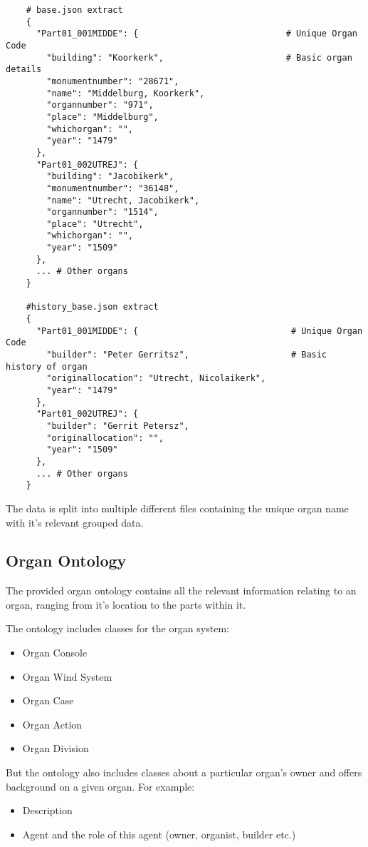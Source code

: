 \begin{lstlisting}
    # base.json extract
    {
      "Part01_001MIDDE": {                             # Unique Organ Code
        "building": "Koorkerk",                        # Basic organ details
        "monumentnumber": "28671",
        "name": "Middelburg, Koorkerk",
        "organnumber": "971",
        "place": "Middelburg",
        "whichorgan": "",
        "year": "1479"
      },
      "Part01_002UTREJ": {
        "building": "Jacobikerk",
        "monumentnumber": "36148",
        "name": "Utrecht, Jacobikerk",
        "organnumber": "1514",
        "place": "Utrecht",
        "whichorgan": "",
        "year": "1509"
      },
      ... # Other organs
    }

    #history_base.json extract
    {
      "Part01_001MIDDE": {                              # Unique Organ Code
        "builder": "Peter Gerritsz",                    # Basic history of organ
        "originallocation": "Utrecht, Nicolaikerk",
        "year": "1479"
      },
      "Part01_002UTREJ": {
        "builder": "Gerrit Petersz",
        "originallocation": "",
        "year": "1509"
      },
      ... # Other organs
    }
\end{lstlisting}

The data is split into multiple different files containing the unique organ name with it's relevant grouped data.  

\subsection{Organ Ontology}
\hspace{0.5cm} The provided organ ontology contains all the relevant information relating to an organ, ranging from it's location to the parts within it. 

The ontology includes classes for the organ system:
\begin{itemize}
\item Organ Console
\item Organ Wind System
\item Organ Case
\item Organ Action
\item Organ Division
\end{itemize}

But the ontology also includes classes about a particular organ's owner and offers background on a given organ. For example:
\begin{itemize}
\item Description
\item Agent and the role of this agent (owner, organist, builder etc.)
\end{itemize}


